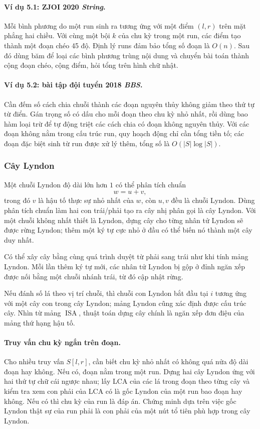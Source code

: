 \documentclass[11pt]{article}
\begin{document}
\paragraph{Ví dụ 5.1: ZJOI 2020 \emph{String}.}
Mỗi bình phương do một run sinh ra tương ứng với một điểm $(l,r)$ trên mặt phẳng
hai chiều. Với cùng một bội $k$ của chu kỳ trong một run, các điểm tạo thành một
đoạn chéo 45 độ. Định lý runs đảm bảo tổng số đoạn là $O(n)$. Sau đó dùng băm để
loại các bình phương trùng nội dung và chuyển bài toán thành cộng đoạn chéo,
cộng điểm, hỏi tổng trên hình chữ nhật.

\paragraph{Ví dụ 5.2: bài tập đội tuyển 2018 \emph{BBS}.}
Cần đếm số cách chia chuỗi thành các đoạn nguyên thủy không giảm theo thứ tự từ
điển. Gán trọng số có dấu cho mỗi đoạn theo chu kỳ nhỏ nhất, rồi dùng bao hàm
loại trừ để tự động triệt các cách chia có đoạn không nguyên thủy. Với các đoạn
không nằm trong cấu trúc run, quy hoạch động chỉ cần tổng tiền tố; các đoạn đặc
biệt sinh từ run được xử lý thêm, tổng số là $O(|S|\log |S|)$.

\subsubsection{Cây Lyndon}

Một chuỗi Lyndon độ dài lớn hơn $1$ có thể phân tích chuẩn
\[
  w=u+v,
\]
trong đó $v$ là hậu tố thực sự nhỏ nhất của $w$, còn $u,v$ đều là chuỗi Lyndon.
Dùng phân tích chuẩn làm hai con trái/phải tạo ra cây nhị phân gọi là cây
Lyndon. Với một chuỗi không nhất thiết là Lyndon, dựng cây cho từng nhân tử
Lyndon sẽ được rừng Lyndon; thêm một ký tự cực nhỏ ở đầu có thể biến nó thành
một cây duy nhất.

Có thể xây cây bằng cùng quá trình duyệt từ phải sang trái như khi tính mảng
Lyndon. Mỗi lần thêm ký tự mới, các nhân tử Lyndon bị gộp ở đỉnh ngăn xếp được
nối bằng một chuỗi nhánh trái, từ đó cập nhật rừng.

Nếu đánh số lá theo vị trí chuỗi, thì chuỗi con Lyndon bắt đầu tại $i$ tương
ứng với một cây con trong cây Lyndon; mảng Lyndon cũng xác định được cấu trúc
cây. Nhìn từ mảng $\operatorname{ISA}$, thuật toán dựng cây chính là ngăn xếp
đơn điệu của mảng thứ hạng hậu tố.

\paragraph{Truy vấn chu kỳ ngắn trên đoạn.}
Cho nhiều truy vấn $S[l,r]$, cần biết chu kỳ nhỏ nhất có không quá nửa độ dài
đoạn hay không. Nếu có, đoạn nằm trong một run. Dựng hai cây Lyndon ứng với hai
thứ tự chữ cái ngược nhau; lấy LCA của các lá trong đoạn theo từng cây và kiểm
tra xem con phải của LCA có là gốc Lyndon của một run bao đoạn hay không. Nếu có
thì chu kỳ của run là đáp án. Chứng minh dựa trên việc gốc Lyndon thật sự của
run phải là con phải của một nút tổ tiên phù hợp trong cây Lyndon.
\end{document}
